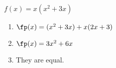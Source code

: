 {$f(x) = x(x^2+3x)$
}
{\begin{enumerate}
\item		$\fp(x) =(x^2+3x)+x(2x+3)$
\item		$\fp(x) = 3x^2 + 6x$
\item		They are equal.
\end{enumerate}
}
